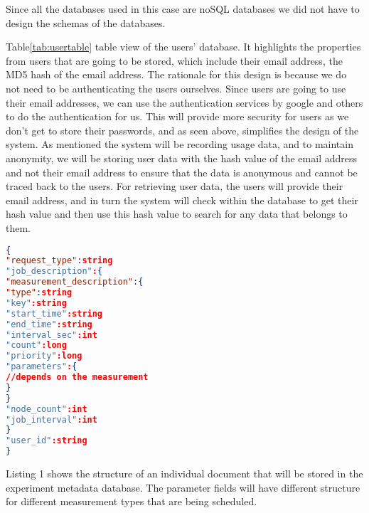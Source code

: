 Since all the databases used in this case are noSQL databases we did not have to design the schemas of the databases.
\begin{table}[h!]
        \caption{Table showing a table view of the Users database, highlighting the properties stored in the database.}
        \label{tab:usertable}
\end{table}
Table\ref{tab:usertable} table view of the users' database.
It highlights the properties from users that are going to be stored, which include their email address, the MD5 hash of the email address.
The rationale for this design is because we do not need to be authenticating the users ourselves.
Since users are going to use their email addresses, we can use the authentication services by google and others to do the authentication for us.
This will provide more security for users as we don't get to store their passwords, and as seen above, simplifies the design of the system.
As mentioned the system will be recording usage data, and to maintain anonymity, we will be storing user data with the hash value of the email address and not their email address to ensure that the data is anonymous and cannot be traced back to the users.
For retrieving user data, the users will provide their email address, and in turn the system will check within the database to get their hash value and then use this hash value to search for any data that belongs to them.
\begin{lstlisting}[language=json, caption=JSON structure showing how the experiment metada documemts stored in the database will look like]
{
"request_type":string
"job_description":{
"measurement_description":{
"type":string
"key":string
"start_time":string
"end_time":string
"interval_sec":int
"count":long
"priority":long
"parameters":{
//depends on the measurement
}
}
"node_count":int
"job_interval":int
}
"user_id":string
}
\end{lstlisting}
Listing 1 shows the structure of an individual document that will be stored in the experiment metadata database.
The parameter fields will have different structure for different measurement types that are being scheduled.
